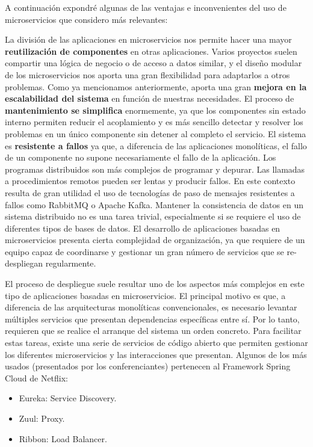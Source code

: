 A continuación expondré algunas de las ventajas e inconvenientes del uso de microservicios que considero más relevantes:
\begin{itemize}
\pro La división de las aplicaciones en microservicios nos permite hacer una mayor \textbf{reutilización de componentes} en otras aplicaciones. Varios proyectos suelen compartir una lógica de negocio o de acceso a datos similar, y el diseño modular de los microservicios nos aporta una gran flexibilidad para adaptarlos a otros problemas.
\pro Como ya mencionamos anteriormente, aporta una gran \textbf{mejora en la escalabilidad del sistema} en función de nuestras necesidades.
\pro El proceso de \textbf{mantenimiento se simplifica} enormemente, ya que los componentes sin estado interno permiten reducir el acoplamiento y es más sencillo detectar y resolver los problemas en un único componente sin detener al completo el servicio.
\pro El sistema es \textbf{resistente a fallos} ya que, a diferencia de las aplicaciones monolíticas, el fallo de un componente no supone necesariamente el fallo de la aplicación.
\con Los programas distribuidos son más complejos de programar y depurar. Las llamadas a procedimientos remotos pueden ser lentas y producir fallos. En este contexto resulta de gran utilidad el uso de tecnologías de paso de mensajes resistentes a fallos como RabbitMQ o Apache Kafka.
\con Mantener la consistencia de datos en un sistema distribuido no es una tarea trivial, especialmente si se requiere el uso de diferentes tipos de bases de datos.
\con El desarrollo de aplicaciones basadas en microservicios presenta cierta complejidad de organización, ya que requiere de un equipo capaz de coordinarse y gestionar un gran número de servicios que se re-despliegan regularmente.
\end{itemize}

El proceso de despliegue suele resultar uno de los aspectos más complejos en este tipo de aplicaciones basadas en microservicios. El principal motivo es que, a diferencia de las arquitecturas monolíticas convencionales, es necesario levantar múltiples servicios que presentan dependencias específicas entre sí. Por lo tanto, requieren que se realice el arranque del sistema un orden concreto. Para facilitar estas tareas, existe una serie de servicios de código abierto que permiten gestionar los diferentes microservicios y las interacciones que presentan. Algunos de los más usados (presentados por los conferenciantes) pertenecen al Framework Spring Cloud de Netflix:
\begin{itemize}
\item Eureka: Service Discovery.
\item Zuul: Proxy.
\item Ribbon: Load Balancer.
\end{itemize}

